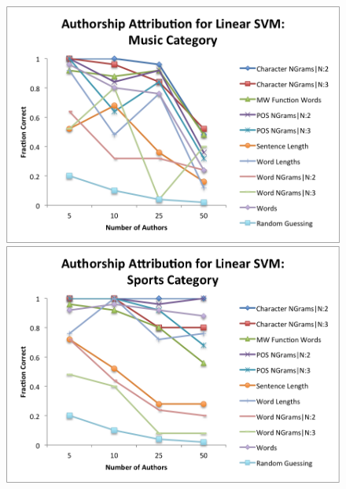 \documentclass[pageno]{jpaper}
\begin{document}
\begin{figure}[h!]
\begin{center}
\includegraphics*[scale=.75]{SVMMusic}
\includegraphics*[scale=.75]{SVMSports}
\end{center}
\label{fig:SVMCategories2}
\end{figure}
\end{document}
